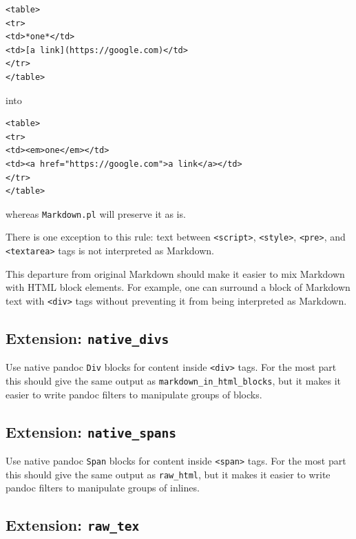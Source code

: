 \documentclass[
  b5paper
]{book}
\begin{document}
\begin{verbatim}
<table>
<tr>
<td>*one*</td>
<td>[a link](https://google.com)</td>
</tr>
</table>
\end{verbatim}

into

\begin{verbatim}
<table>
<tr>
<td><em>one</em></td>
<td><a href="https://google.com">a link</a></td>
</tr>
</table>
\end{verbatim}

whereas \texttt{Markdown.pl} will preserve it as is.

There is one exception to this rule: text between
\texttt{\textless{}script\textgreater{}},
\texttt{\textless{}style\textgreater{}},
\texttt{\textless{}pre\textgreater{}}, and
\texttt{\textless{}textarea\textgreater{}} tags is not interpreted as
Markdown.

This departure from original Markdown should make it easier to mix
Markdown with HTML block elements. For example, one can surround a block
of Markdown text with \texttt{\textless{}div\textgreater{}} tags without
preventing it from being interpreted as Markdown.

\subsection{\texorpdfstring{Extension:
\texttt{native\_divs}}{Extension: native\_divs}}\label{extension-native_divs}

Use native pandoc \texttt{Div} blocks for content inside
\texttt{\textless{}div\textgreater{}} tags. For the most part this
should give the same output as \texttt{markdown\_in\_html\_blocks}, but
it makes it easier to write pandoc filters to manipulate groups of
blocks.

\subsection{\texorpdfstring{Extension:
\texttt{native\_spans}}{Extension: native\_spans}}\label{extension-native_spans}

Use native pandoc \texttt{Span} blocks for content inside
\texttt{\textless{}span\textgreater{}} tags. For the most part this
should give the same output as \texttt{raw\_html}, but it makes it
easier to write pandoc filters to manipulate groups of inlines.

\subsection{\texorpdfstring{Extension:
\texttt{raw\_tex}}{Extension: raw\_tex}}\label{extension-raw_tex}
\end{document}
